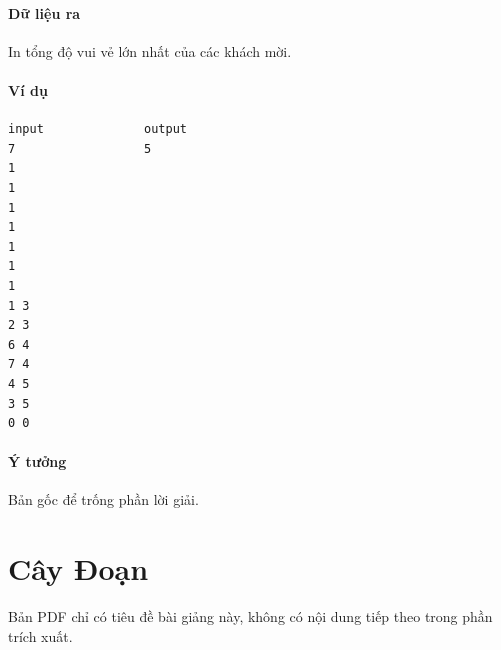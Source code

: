 \documentclass[11pt]{article}
\newcommand{\iosec}[1]{\paragraph{#1}}
\begin{document}
\iosec{Dữ liệu ra}
In tổng độ vui vẻ lớn nhất của các khách mời.

\iosec{Ví dụ}
\begin{verbatim}
input              output
7                  5
1
1
1
1
1
1
1
1 3
2 3
6 4
7 4
4 5
3 5
0 0
\end{verbatim}

\iosec{Ý tưởng}
Bản gốc để trống phần lời giải.

\section{Cây Đoạn}

Bản PDF chỉ có tiêu đề bài giảng này, không có nội dung tiếp theo trong phần trích xuất.
\end{document}
